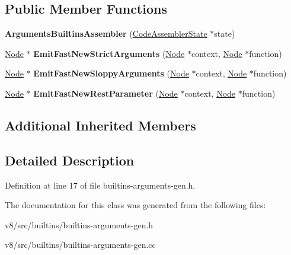 \subsection*{Public Member Functions}
\begin{DoxyCompactItemize}
\item 
\mbox{\label{classv8_1_1internal_1_1ArgumentsBuiltinsAssembler_ab58bed6955de3aabdad36c450112fa97}} 
{\bfseries Arguments\+Builtins\+Assembler} (\mbox{\hyperlink{classv8_1_1internal_1_1compiler_1_1CodeAssemblerState}{Code\+Assembler\+State}} $\ast$state)
\item 
\mbox{\label{classv8_1_1internal_1_1ArgumentsBuiltinsAssembler_a39f8c5866a228f499b8807383061aa2b}} 
\mbox{\hyperlink{classv8_1_1internal_1_1compiler_1_1Node}{Node}} $\ast$ {\bfseries Emit\+Fast\+New\+Strict\+Arguments} (\mbox{\hyperlink{classv8_1_1internal_1_1compiler_1_1Node}{Node}} $\ast$context, \mbox{\hyperlink{classv8_1_1internal_1_1compiler_1_1Node}{Node}} $\ast$function)
\item 
\mbox{\label{classv8_1_1internal_1_1ArgumentsBuiltinsAssembler_a2532f45829db1daee317e5505e12626e}} 
\mbox{\hyperlink{classv8_1_1internal_1_1compiler_1_1Node}{Node}} $\ast$ {\bfseries Emit\+Fast\+New\+Sloppy\+Arguments} (\mbox{\hyperlink{classv8_1_1internal_1_1compiler_1_1Node}{Node}} $\ast$context, \mbox{\hyperlink{classv8_1_1internal_1_1compiler_1_1Node}{Node}} $\ast$function)
\item 
\mbox{\label{classv8_1_1internal_1_1ArgumentsBuiltinsAssembler_a37d0dd515ea2e4039eb750c82689fa27}} 
\mbox{\hyperlink{classv8_1_1internal_1_1compiler_1_1Node}{Node}} $\ast$ {\bfseries Emit\+Fast\+New\+Rest\+Parameter} (\mbox{\hyperlink{classv8_1_1internal_1_1compiler_1_1Node}{Node}} $\ast$context, \mbox{\hyperlink{classv8_1_1internal_1_1compiler_1_1Node}{Node}} $\ast$function)
\end{DoxyCompactItemize}
\subsection*{Additional Inherited Members}


\subsection{Detailed Description}


Definition at line 17 of file builtins-\/arguments-\/gen.\+h.



The documentation for this class was generated from the following files\+:\begin{DoxyCompactItemize}
\item 
v8/src/builtins/builtins-\/arguments-\/gen.\+h\item 
v8/src/builtins/builtins-\/arguments-\/gen.\+cc\end{DoxyCompactItemize}
